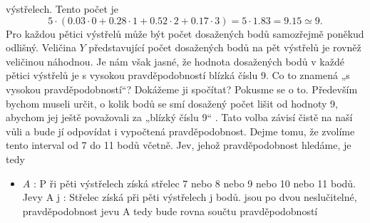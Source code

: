 \begin{example}
  výstřelech. Tento počet je
  \begin{equation*}
    5\cdot(\num{0.03}\cdot0 + \num{0.28}\cdot1 + \num{0.52}\cdot2 + \num{0.17}\cdot3) = 
    5\cdot\num{1.83} = \num{9.15} \simeq 9.
  \end{equation*}
  Pro každou pětici výstřelů může být počet dosažených bodů samozřejmě poněkud odlišný. Veličina 
  \(Y\) představující počet dosažených bodů na pět výstřelů je rovněž veličinou náhodnou. Je nám 
  však jasné, že hodnota dosažených bodů v každé pětici výstřelů je s vysokou pravděpodobností 
  blízká číslu 9. Co to znamená „s vysokou pravděpodobností“? Dokážeme ji spočítat? Pokusme se o 
  to. Především bychom museli určit, o kolik bodů se smí dosažený počet lišit od hodnoty 9, abychom 
  jej ještě považovali za „blízký číslu 9“ . Tato volba závisí čistě na naší vůli a bude jí 
  odpovídat i vypočtená pravděpodobnost. Dejme tomu, že zvolíme tento interval od 7 do 11 bodů 
  včetně. Jev, jehož pravděpodobnost hledáme, je tedy
  \begin{itemize}
    \item \(A\) : P ři pěti výstřelech získá střelec 7 nebo 8 nebo 9 nebo 10 nebo 11 bodů.
  Jevy
  A j : Střelec získá při pěti výstřelech j bodů.
    jsou po dvou neslučitelné, pravděpodobnost jevu A tedy bude rovna součtu pravděpodobností
  \end{itemize}
\normalsize
\end{example}